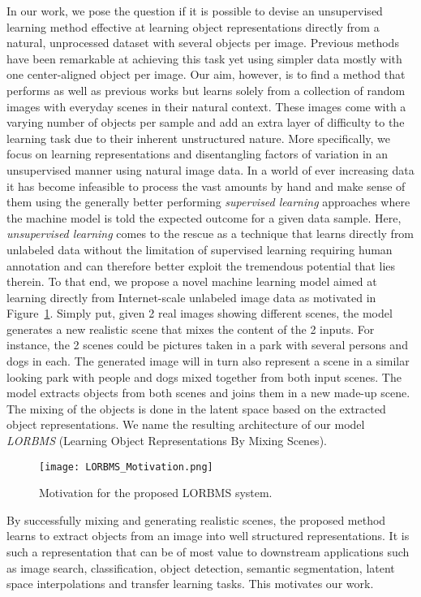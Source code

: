 \documentclass[a4paper,12pt]{report}
\begin{document}
In our work, we pose the question if it is possible to devise an unsupervised learning method effective at learning object representations directly from a natural, unprocessed dataset with several objects per image. Previous methods have been remarkable at achieving this task yet using simpler data mostly with one center-aligned object per image. Our aim, however, is to find a method that performs as well as previous works but learns solely from a collection of random images with everyday scenes in their natural context. These images come with a varying number of objects per sample and add an extra layer of difficulty to the learning task due to their inherent unstructured nature. More specifically, we focus on learning representations and disentangling factors of variation in an unsupervised manner using natural image data. In a world of ever increasing data it has become infeasible to process the vast amounts by hand and make sense of them using the generally better performing \textit{supervised learning} approaches where the machine model is told the expected outcome for a given data sample. Here, \textit{unsupervised learning} comes to the rescue as a technique that learns directly from unlabeled data without the limitation of supervised learning requiring human annotation and can therefore better exploit the tremendous potential that lies therein. To that end, we propose a novel machine learning model aimed at learning directly from Internet-scale unlabeled image data as motivated in Figure~\ref{fig:idea_lorbms}. Simply put, given 2 real images showing different scenes, the model generates a new realistic scene that mixes the content of the 2 inputs. For instance, the 2 scenes could be pictures taken in a park with several persons and dogs in each. The generated image will in turn also represent a scene in a similar looking park with people and dogs mixed together from both input scenes. The model extracts objects from both scenes and joins them in a new made-up scene. The mixing of the objects is done in the latent space based on the extracted object representations. We name the resulting architecture of our model \textit{LORBMS} (Learning Object Representations By Mixing Scenes).
\begin{figure}[ht]
\centering
\texttt{[image: LORBMS\_Motivation.png]}
\caption{Motivation for the proposed LORBMS system.}
\label{fig:idea_lorbms}
\end{figure}

By successfully mixing and generating realistic scenes, the proposed method learns to extract objects from an image into well structured representations. It is such a representation that can be of most value to downstream applications such as image search, classification, object detection, semantic segmentation, latent space interpolations and transfer learning tasks. This motivates our work.
\end{document}
